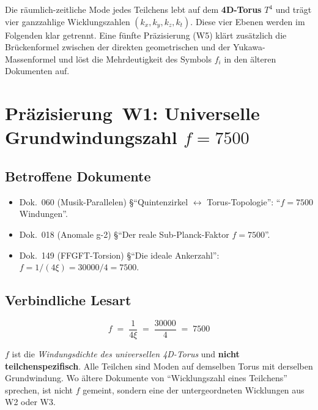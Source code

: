 Die räumlich-zeitliche Mode jedes Teilchens lebt auf dem
\textbf{4D-Torus} $T^4$ und trägt vier ganzzahlige Wicklungszahlen
$(k_x, k_y, k_z, k_t)$. Diese vier Ebenen werden im Folgenden klar
getrennt. Eine fünfte Präzisierung (W5) klärt zusätzlich die
Brückenformel zwischen der direkten geometrischen und der
Yukawa-Massenformel und löst die Mehrdeutigkeit des Symbols $f_i$
in den älteren Dokumenten auf.

\section{\texorpdfstring{Präzisierung~W1: Universelle Grundwindungszahl $f = 7500$}{Praezisierung W1: Universelle Grundwindungszahl f = 7500}}

\subsection*{Betroffene Dokumente}

\begin{itemize}
  \item Dok.~060 (Musik-Parallelen) §\enquote{Quintenzirkel
        $\leftrightarrow$ Torus-Topologie}: \enquote{$f = 7500$ Windungen}.
  \item Dok.~018 (Anomale g-2) §\enquote{Der reale Sub-Planck-Faktor
        $f = 7500$}.
  \item Dok.~149 (FFGFT-Torsion) §\enquote{Die ideale Ankerzahl}:
        $f = 1/(4\xi) = 30000/4 = 7500$.
\end{itemize}

\subsection*{Verbindliche Lesart}

\begin{equation}
  \boxed{\;f \;=\; \frac{1}{4\xi} \;=\; \frac{30000}{4} \;=\; 7500\;}
  \tag{210.1}
\end{equation}

$f$ ist die \emph{Windungsdichte des universellen 4D-Torus} und
\textbf{nicht teilchenspezifisch}. Alle Teilchen sind Moden auf
demselben Torus mit derselben Grundwindung. Wo ältere Dokumente von
\enquote{Wicklungszahl eines Teilchens} sprechen, ist nicht $f$
gemeint, sondern eine der untergeordneten Wicklungen aus
W2 oder W3.

